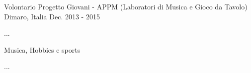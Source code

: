 \begin{cventries}
  \cventry
    {Volontario} %
    {Progetto Giovani - APPM (Laboratori di Musica e Gioco da Tavolo)} %
    {Dimaro, Italia} %
    {Dec. 2013 - 2015} %
    {
      \begin{cvitems} %
        \item {...}
      \end{cvitems}
    }

  \cventry
    {Musica, } %
    {Hobbies e sports} %
    {} %
    {} %
    {
      \begin{cvitems} %
        \item {...}
      \end{cvitems}
    }

\end{cventries}